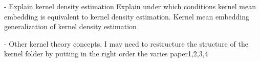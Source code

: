 - Explain kernel density estimation
Explain under which conditions kernel mean embedding
is equivalent to kernel density estimation.
Kernel mean embedding generalization of kernel density estimation

- Other kernel theory concepts, I may need to
restructure the structure of the kernel folder
by putting in the right order the varies paper1,2,3,4




